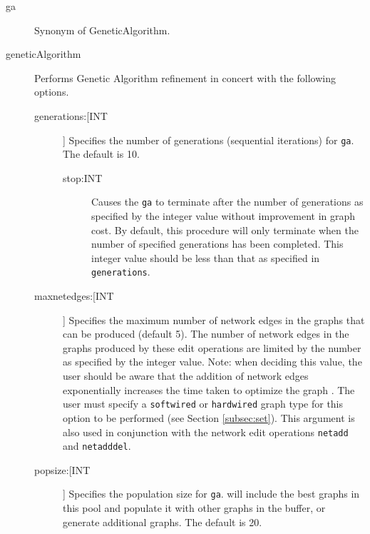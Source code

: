 	\begin{description}
				
		\item[ga] Synonym of GeneticAlgorithm.
		
		\item[geneticAlgorithm] Performs Genetic Algorithm \citep{Holland1975} refinement in 
		concert with the following options.
					
		\begin{description}
			
			
			\item[generations:[INT]] Specifies the number of generations (sequential iterations) 
			for \texttt{ga}. The default is 10.
			
			\begin{description}
			
				\item[stop:INT] Causes the \texttt{ga} to terminate after the number of 
				generations as specified by the integer value without improvement in graph 
				cost. By default, this procedure will only terminate when the number of 
				specified generations has been completed. This integer value should be less 
				than that as specified in \texttt{generations}.
			
			\end{description}
			
			\item[maxnetedges:[INT]] Specifies the maximum number of network edges in the 
			graphs that can be produced (default 5). The number of network edges in the graphs 
			produced by these edit operations are limited by the number as specified by the 
			integer value. Note: when deciding this value, the user should be aware that the 
			addition of network edges exponentially increases the time taken to optimize the 
			graph \cite{WheelerandWashburn2023}. The user must specify a \texttt{softwired} or 
			\texttt{hardwired} graph type for this option to be performed (see Section 
			\ref{subsec:set}). This argument is also used in conjunction with the network edit 	
			operations \texttt{netadd} and \texttt{netadddel}. 

			\item[popsize:[INT]] Specifies the population size for \texttt{ga}. \phyg will include the 
			best graphs in this pool and populate it with other graphs in the buffer, or generate
			additional graphs. The default is 20.
			

\end{description}
\end{description}
